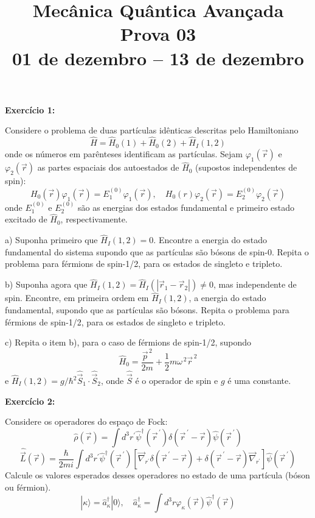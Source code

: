 \documentclass[12pt]{article}
\title{Mecânica Quântica Avançada\\%
Prova 03\\%
01 de dezembro -- 13 de dezembro}
\date{}
\begin{document}
\maketitle
\vspace*{-4em}

\textbf{Exercício 1:} 

Considere o problema de duas partículas idênticas descritas pelo Hamiltoniano
\[
\hat{H}=\hat{H}_{0}(1)+\hat{H}_{0}(2)+\hat{H}_{I}(1,2)
\]
onde os números em parênteses identificam as partículas.
Sejam $\varphi_1(\vec{r})$ e  $\varphi_2(\vec{r})$ as partes espaciais dos autoestados de $\hat{H}_{0}$
(supostos independentes de spin):
\[
H_{0}(\vec{r}) \varphi_{1}(\vec{r})=E_{1}^{(0)} \varphi_{1}(\vec{r}), \quad H_{0}(r) \varphi_{2}(\vec{r})=E_{2}^{(0)} \varphi_{2}(\vec{r})
\]
onde $E_{1}^{(0)}$ e $E_{2}^{(0)}$ são as energias dos estados fundamental e primeiro estado excitado de
$\hat{H}_{0}$, respectivamente.

a) Suponha primeiro que $\hat{H}_{I}(1,2) = 0$. 
Encontre a energia do estado fundamental do sistema supondo que as partículas são bósons de spin-0.
Repita o problema para férmions de spin-1/2, para os estados de singleto e tripleto.

b) Suponha agora que  $\hat{H}_{I}(1,2) =\hat{H}_{I}\left(\left|\vec{r}_{1}-\vec{r}_{2}\right|\right) \neq 0$, mas independente de spin.
Encontre, em primeira ordem em $\hat{H}_{I}(1,2)$, a energia do estado fundamental, supondo que as partículas são bósons.
Repita o problema para férmions de spin-1/2, para os estados de singleto e tripleto.

c) Repita o item b), para o caso de férmions de spin-1/2, supondo
\[
\hat{H}_{0}=\frac{\vec{p}^{\,2}}{2 m}+\frac{1}{2} m \omega^{\,2} \vec{r}^{\,2}
\]
e $\hat{H}_{I}(1,2)=g / \hbar^{2} \hat{\vec{S}}_{1} \cdot \hat{\vec{S}}_{2}$,
onde $\hat{\vec{S}}$ é o operador de spin e $g$ é uma constante.

\textbf{Exercício 2:} 

Considere os operadores do espaço de Fock:
\[
\hat{\rho}(\vec{r})=\int d^{3} r^{\prime} \hat{\psi}^{\dagger}\left(\vec{r}^{\,\prime}\right) \delta\left(\vec{r}^{\,\prime}-\vec{r}\right) \hat{\psi}\left(\vec{r}^{\,\prime}\right)
\]
\[
\hat{\vec{L}}(\vec{r})=\frac{\hbar}{2 m i} \int d^{3} r^{\prime} \hat{\psi}^{\dagger}\left(\vec{r}^{\,\prime}\right)\left[\vec{\nabla}_{r^{\prime}} \delta\left(\vec{r}^{\,\prime}-\vec{r}\right)+\delta\left(\vec{r}^{\,\prime}-\vec{r}\right) \vec{\nabla}_{r^{\prime}}\right] \hat{\psi}\left(\vec{r}^{\,\prime}\right)
\]
Calcule os valores esperados desses operadores no estado de uma partícula (bóson ou férmion).
\[
|\kappa\rangle=\hat{a}_{\kappa}^{\dagger}|0\rangle, \quad \hat{a}_{\kappa}^{\dagger}=\int d^{3} r \varphi_{\kappa}(\vec{r}) \hat{\psi}^{\dagger}(\vec{r})
\]
\end{document}

